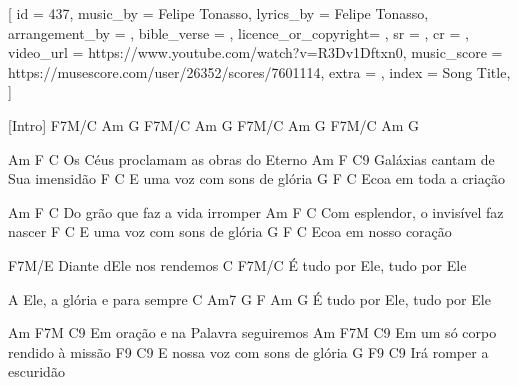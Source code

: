 [
    id                  = {437},
    music_by            = {Felipe Tonasso}, %
    lyrics_by           = {Felipe Tonasso}, %
    arrangement_by      = {}, %
    bible_verse         = {},
    licence_or_copyright= {},
    sr                  = {},
    cr                  = {},
    video_url           = {https://www.youtube.com/watch?v=R3Dv1Dftxn0}, %
    music_score         = {https://musescore.com/user/26352/scores/7601114},
    extra               = {},
    index               = {Song Title},
]

\beginverse

[Intro] F7M/C  Am  G
        F7M/C  Am  G
        F7M/C  Am  G
        F7M/C  Am  G

             Am        F             C 
  Os Céus proclamam as obras do Eterno
           Am        F            C9
  Galáxias cantam de Sua imensidão
        F                C
  E uma voz com sons de glória
          G      F  C
  Ecoa em toda a criação

\endverse

\beginverse
              Am    F            C
  Do grão que faz a vida irromper
            Am         F               C
  Com esplendor, o invisível faz nascer
      F                 C
  E uma voz com sons de glória
          G     F  C
  Ecoa em nosso coração         
\endverse

\beginverse
F7M/E
  Diante dEle nos rendemos
    C                        F7M/C 
  É tudo por Ele, tudo por Ele

  A Ele, a glória e para sempre
    C             Am7      G   F  Am  G
  É tudo por Ele, tudo por Ele
\endverse

\beginverse
        Am         F7M            C9
  Em oração e na Palavra seguiremos
           Am       F7M         C9
  Em um só corpo rendido à missão
           F9               C9
  E nossa voz com sons de glória
          G    F9    C9 
  Irá romper a escuridão

\endverse

